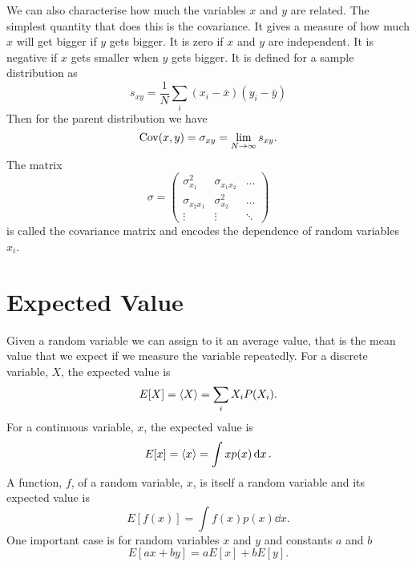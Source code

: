    We can also characterise how much the variables \(x\) and \(y\) are related.
    The simplest quantity that does this is the covariance.
    It gives a measure of how much \(x\) will get bigger if \(y\) gets bigger.
    It is zero if \(x\) and \(y\) are independent.
    It is negative if \(x\) gets smaller when \(y\) gets bigger.
    It is defined for a sample distribution as
    \[s_{xy} = \frac{1}{N}\sum_{i} (x_i - \bar{x})(y_i - \bar{y})\]
    Then for the parent distribution we have
    \[\operatorname{Cov}(x, y) = \sigma_{xy} = \lim_{N\to\infty} s_{xy}.\]
    The matrix
    \[
        \sigma = 
        \begin{pmatrix}
            \sigma_{x_1}^2 & \sigma_{x_1x_2} & \dotsc\\
            \sigma_{x_2x_1} & \sigma_{x_2}^2 & \dotsc\\
            \vdots & \vdots & \ddots
        \end{pmatrix}
    \]
    is called the covariance matrix and encodes the dependence of random variables \(x_i\).
    
    \section{Expected Value}
    Given a random variable we can assign to it an average value, that is the mean value that we expect if we measure the variable repeatedly.
    For a discrete variable, \(X\), the expected value is
    \[E[X] = \langle{X}\rangle = \sum_i X_iP(X_i).\]
    For a continuous variable, \(x\), the expected value is
    \[E[x] = \langle{x}\rangle = \int xp(x)\dd{x}.\]
    A function, \(f\), of a random variable, \(x\), is itself a random variable and its expected value is
    \[E[f(x)] = \int f(x)p(x)\dd{x}.\]
    One important case is for random variables \(x\) and \(y\) and constants \(a\) and \(b\)
    \[E[ax + by] = aE[x] + bE[y].\]
    
